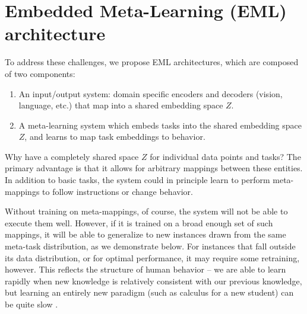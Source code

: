 \documentclass{article}
\begin{document}
\section{Embedded Meta-Learning (EML) architecture}
\vspace{-0.5em} %
To address these challenges, we propose EML architectures, which are composed of two components: 
\vspace{-1em}
\begin{enumerate} \setlength \itemsep{0em}
\item An input/output system: domain specific encoders and decoders (vision, language, etc.) that map into a shared embedding space $Z$.
\item A meta-learning system which embeds tasks into the shared embedding space $Z$, and learns to map task embeddings to behavior.
\end{enumerate}
\vspace{-0.75em}
Why have a completely shared space $Z$ for individual data points and tasks? The primary advantage is that it allows for arbitrary mappings between these entities. In addition to basic tasks, the system could in principle learn to perform meta-mappings to follow instructions or change behavior. \par
Without training on meta-mappings, of course, the system will not be able to execute them well. However, if it is trained on a broad enough set of such mappings, it will be able to generalize to new instances drawn from the same meta-task distribution, as we demonstrate below. For instances that fall outside its data distribution, or for optimal performance, it may require some retraining, however. This reflects the structure of human behavior -- we are able to learn rapidly when new knowledge is relatively consistent with our previous knowledge, but learning an entirely new paradigm (such as calculus for a new student) can be quite slow \citep[cf.][]{Kumaran2016, Botvinick2019}. \par 
\end{document}
